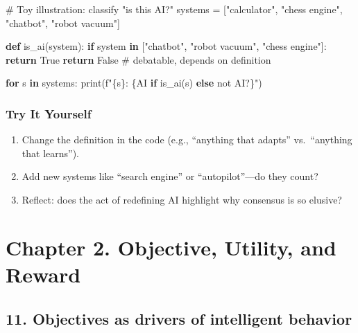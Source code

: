 \documentclass[
  letterpaper,
  DIV=11,
  numbers=noendperiod]{scrreprt}
\newenvironment{Shaded}{\begin{snugshade}}{\end{snugshade}}
\newcommand{\BuiltInTok}[1]{\textcolor[rgb]{0.00,0.23,0.31}{#1}}
\newcommand{\CommentTok}[1]{\textcolor[rgb]{0.37,0.37,0.37}{#1}}
\newcommand{\ControlFlowTok}[1]{\textcolor[rgb]{0.00,0.23,0.31}{\textbf{#1}}}
\newcommand{\KeywordTok}[1]{\textcolor[rgb]{0.00,0.23,0.31}{\textbf{#1}}}
\newcommand{\NormalTok}[1]{\textcolor[rgb]{0.00,0.23,0.31}{#1}}
\newcommand{\OperatorTok}[1]{\textcolor[rgb]{0.37,0.37,0.37}{#1}}
\newcommand{\SpecialCharTok}[1]{\textcolor[rgb]{0.37,0.37,0.37}{#1}}
\newcommand{\SpecialStringTok}[1]{\textcolor[rgb]{0.13,0.47,0.30}{#1}}
\newcommand{\StringTok}[1]{\textcolor[rgb]{0.13,0.47,0.30}{#1}}
\newcommand{\VariableTok}[1]{\textcolor[rgb]{0.07,0.07,0.07}{#1}}
\providecommand{\tightlist}{%
  \setlength{\itemsep}{0pt}\setlength{\parskip}{0pt}}
\begin{document}
\begin{Shaded}
\begin{Highlighting}[]
\CommentTok{\# Toy illustration: classify "is this AI?"}
\NormalTok{systems }\OperatorTok{=}\NormalTok{ [}\StringTok{"calculator"}\NormalTok{, }\StringTok{"chess engine"}\NormalTok{, }\StringTok{"chatbot"}\NormalTok{, }\StringTok{"robot vacuum"}\NormalTok{]}

\KeywordTok{def}\NormalTok{ is\_ai(system):}
    \ControlFlowTok{if}\NormalTok{ system }\KeywordTok{in}\NormalTok{ [}\StringTok{"chatbot"}\NormalTok{, }\StringTok{"robot vacuum"}\NormalTok{, }\StringTok{"chess engine"}\NormalTok{]:}
        \ControlFlowTok{return} \VariableTok{True}
    \ControlFlowTok{return} \VariableTok{False}  \CommentTok{\# debatable, depends on definition}

\ControlFlowTok{for}\NormalTok{ s }\KeywordTok{in}\NormalTok{ systems:}
    \BuiltInTok{print}\NormalTok{(}\SpecialStringTok{f"}\SpecialCharTok{\{}\NormalTok{s}\SpecialCharTok{\}}\SpecialStringTok{: }\SpecialCharTok{\{}\StringTok{\textquotesingle{}AI\textquotesingle{}} \ControlFlowTok{if}\NormalTok{ is\_ai(s) }\ControlFlowTok{else} \StringTok{\textquotesingle{}not AI?\textquotesingle{}}\SpecialCharTok{\}}\SpecialStringTok{"}\NormalTok{)}
\end{Highlighting}
\end{Shaded}

\subsubsection{Try It Yourself}\label{try-it-yourself-9}

\begin{enumerate}
\def\labelenumi{\arabic{enumi}.}
\tightlist
\item
  Change the definition in the code (e.g., ``anything that adapts''
  vs.~``anything that learns'').
\item
  Add new systems like ``search engine'' or ``autopilot''---do they
  count?
\item
  Reflect: does the act of redefining AI highlight why consensus is so
  elusive?
\end{enumerate}

\section{Chapter 2. Objective, Utility, and
Reward}\label{chapter-2.-objective-utility-and-reward}

\subsection{11. Objectives as drivers of intelligent
behavior}\label{objectives-as-drivers-of-intelligent-behavior}
\end{document}
